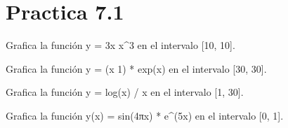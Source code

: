 \documentclass[letterpaper,10pt,spanish]{sphinxmanual}
\begin{document}
\section{Practica 7.1}
\label{\detokenize{pr7:module-pr7.1}}\label{\detokenize{pr7:practica-7-1}}

\begin{fulllineitems}
\label{\detokenize{pr7:pr7.1.grafico_1}}
\pysigstartsignatures
{}
\pysigstopsignatures
\sphinxAtStartPar
Grafica la función y = 3x \sphinxhyphen{} x\textasciicircum{}3 en el intervalo {[}\sphinxhyphen{}10, 10{]}.

\end{fulllineitems}


\begin{fulllineitems}
\label{\detokenize{pr7:pr7.1.grafico_10}}
\pysigstartsignatures
{}
\pysigstopsignatures
\sphinxAtStartPar
Grafica la función y = (x \sphinxhyphen{} 1) * exp(\sphinxhyphen{}x) en el intervalo {[}\sphinxhyphen{}30, 30{]}.

\end{fulllineitems}


\begin{fulllineitems}
\label{\detokenize{pr7:pr7.1.grafico_11}}
\pysigstartsignatures
{}
\pysigstopsignatures
\sphinxAtStartPar
Grafica la función y = log(x) / x en el intervalo {[}1, 30{]}.

\end{fulllineitems}


\begin{fulllineitems}
\label{\detokenize{pr7:pr7.1.grafico_12}}
\pysigstartsignatures
{}
\pysigstopsignatures
\sphinxAtStartPar
Grafica la función y(x) = sin(4πx) * e\textasciicircum{}(\sphinxhyphen{}5x) en el intervalo {[}0, 1{]}.

\end{fulllineitems}
\end{document}
